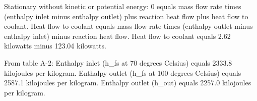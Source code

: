 Stationary without kinetic or potential energy:  
0 equals mass flow rate times (enthalpy inlet minus enthalpy outlet) plus reaction heat flow plus heat flow to coolant.  
Heat flow to coolant equals mass flow rate times (enthalpy outlet minus enthalpy inlet) minus reaction heat flow.  
Heat flow to coolant equals 2.62 kilowatts minus 123.04 kilowatts.  

From table A-2:  
Enthalpy inlet (h_fs at 70 degrees Celsius) equals 2333.8 kilojoules per kilogram.  
Enthalpy outlet (h_fs at 100 degrees Celsius) equals 2587.1 kilojoules per kilogram.  
Enthalpy outlet (h_out) equals 2257.0 kilojoules per kilogram.